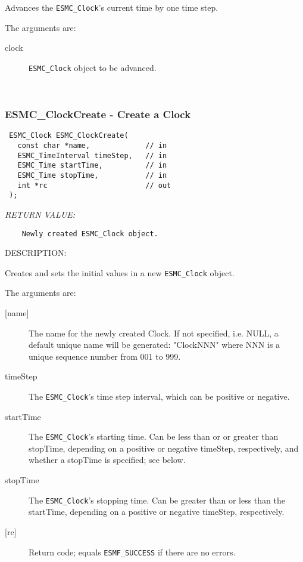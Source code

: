   
    Advances the {\tt ESMC\_Clock}'s current time by one time step.
  
    The arguments are:
    \begin{description}
    \item[clock]
      {\tt ESMC\_Clock} object to be advanced.
    \end{description}
   
 
\mbox{}\hrulefill\ 
 
\subsubsection [ESMC\_ClockCreate] {ESMC\_ClockCreate - Create a Clock}


  
\begin{verbatim} ESMC_Clock ESMC_ClockCreate(
   const char *name,             // in
   ESMC_TimeInterval timeStep,   // in
   ESMC_Time startTime,          // in
   ESMC_Time stopTime,           // in
   int *rc                       // out
 );
 \end{verbatim}{\em RETURN VALUE:}
\begin{verbatim}    Newly created ESMC_Clock object.\end{verbatim}
{\sf DESCRIPTION:\\ }


  
   Creates and sets the initial values in a new {\tt ESMC\_Clock} object. 
  
    The arguments are:
    \begin{description}
    \item[{[name]}]
      The name for the newly created Clock.  If not specified, i.e. NULL,
      a default unique name will be generated: "ClockNNN" where NNN
      is a unique sequence number from 001 to 999.
    \item[timeStep]
      The {\tt ESMC\_Clock}'s time step interval, which can be
      positive or negative.
    \item[startTime]
      The {\tt ESMC\_Clock}'s starting time.  Can be less than or
      or greater than stopTime, depending on a positive or negative
      timeStep, respectively, and whether a stopTime is specified;
      see below.
    \item[stopTime]
      The {\tt ESMC\_Clock}'s stopping time.  Can be greater than or
      less than the startTime, depending on a positive or negative
      timeStep, respectively.
    \item[{[rc]}]
      Return code; equals {\tt ESMF\_SUCCESS} if there are no errors.
    \end{description}
   
